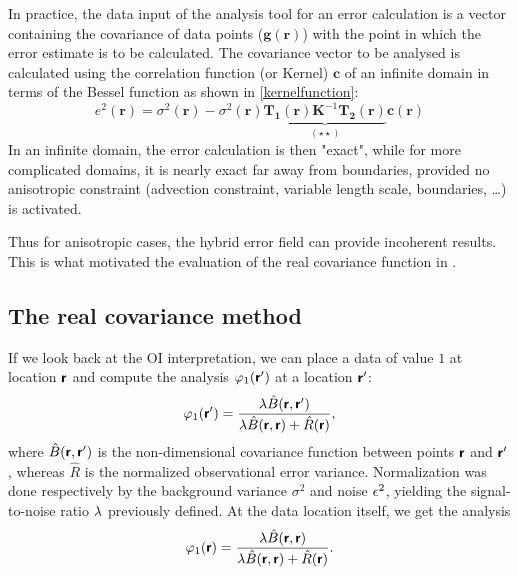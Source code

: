 In practice, the data input of the analysis tool for an error calculation is a vector containing the
covariance of data points ($\mathbf{g}(\mathbf{r})$) with the point in which the error estimate is to be calculated. The covariance vector to be analysed is calculated using the correlation function (or Kernel) $\mathbf{c}$ of an infinite domain in terms of the Bessel function as shown in \eqref{kernelfunction}:
\begin{equation}
e^{2}(\mathbf{r})   = \sigma^{2}(\mathbf{r})-\sigma^{2}(\mathbf{r}) \underbrace{\mathbf{T_{1}}(\mathbf{r})\mathbf{K}^{-1} \mathbf{T_{2}}(\mathbf{r})}_{(\star\star)}		\mathbf{c}(\mathbf{r})
\label{eq:kernelbessel}
\end{equation}
In an infinite domain, the error calculation is then "exact", while for more complicated domains, it is nearly exact far away from boundaries, provided no anisotropic constraint (advection constraint, variable length scale, boundaries, \ldots) is activated. 

Thus for anisotropic cases, the hybrid error field can provide incoherent results. This is what motivated the evaluation of the real covariance function in \diva.


\subsection{The real covariance method\label{sec:realcovariance}}

If we look back at the OI interpretation, we can place a data of value $1$ at location $\mbox{\boldmath $ \protect\mathsf{r} $}$ and compute the analysis $\varphi_1(\mbox{\boldmath $ \protect\mathsf{r} $}^\prime)$ at a location $\mbox{\boldmath $ \protect\mathsf{r} $}^\prime$:
\begin{equation}
\varphi_1(\mbox{\boldmath $ \protect\mathsf{r} $}^\prime) = {\lambda \hat{B} (\mbox{\boldmath $ \protect\mathsf{r} $},\mbox{\boldmath $ \protect\mathsf{r} $}^\prime)\over  \lambda \hat{B}(\mbox{\boldmath $ \protect\mathsf{r} $},\mbox{\boldmath $ \protect\mathsf{r} $}) + \hat{R}(\mbox{\boldmath $ \protect\mathsf{r} $}) },
\end{equation}
where $\hat{B}(\mbox{\boldmath $ \protect\mathsf{r} $},\mbox{\boldmath $ \protect\mathsf{r} $}^\prime)$ is the non-dimensional covariance function between points $\mbox{\boldmath $ \protect\mathsf{r} $}$ and $\mbox{\boldmath $ \protect\mathsf{r} $}^\prime$, whereas $\hat{R}$ is the normalized observational error variance. Normalization was done respectively by the background variance $\sigma^2$ and noise $\epsilon^2$, yielding the signal-to-noise ratio $\lambda$ previously defined. 
At the data location itself, we get the analysis
\begin{equation}
\varphi_1(\mbox{\boldmath $ \protect\mathsf{r} $}) = {\lambda \hat{B} (\mbox{\boldmath $ \protect\mathsf{r} $},\mbox{\boldmath $ \protect\mathsf{r} $}) \over \lambda \hat{B}(\mbox{\boldmath $ \protect\mathsf{r} $},\mbox{\boldmath $ \protect\mathsf{r} $}) + \hat{R}(\mbox{\boldmath $ \protect\mathsf{r} $}) }.
\end{equation}


